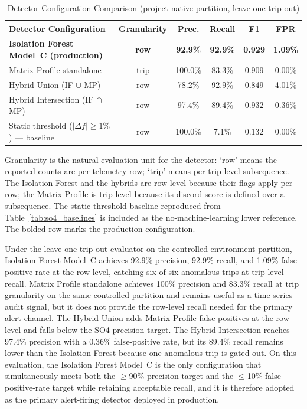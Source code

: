 \begin{table}[!htbp]
\centering
\caption{Detector Configuration Comparison (project-native partition, leave-one-trip-out)}
\label{tab:so4_config_compare}
\scriptsize
\setlength{\tabcolsep}{3pt}
\begin{tabular}{|p{}|c|c|c|c|c|}
\hline
\textbf{Detector Configuration} & \textbf{Granularity} & \textbf{Prec.} & \textbf{Recall} & \textbf{F1} & \textbf{FPR} \\
\hline
\textbf{Isolation Forest Model~C (production)} & \textbf{row} & \textbf{92.9\%} & \textbf{92.9\%} & \textbf{0.929} & \textbf{1.09\%} \\
\hline
Matrix Profile standalone & trip & 100.0\% & 83.3\% & 0.909 & 0.00\% \\
\hline
Hybrid Union (IF $\cup$ MP) & row & 78.2\% & 92.9\% & 0.849 & 4.01\% \\
\hline
Hybrid Intersection (IF $\cap$ MP) & row & 97.4\% & 89.4\% & 0.932 & 0.36\% \\
\hline
Static threshold ($|\Delta f| \geq 1\%$) --- baseline & row & 100.0\% & 7.1\% & 0.132 & 0.00\% \\
\hline
\end{tabular}
\normalsize
\end{table}

\noindent
Granularity is the natural evaluation unit for the detector: `row' means the reported counts are per telemetry row; `trip' means per trip-level subsequence. The Isolation Forest and the hybrids are row-level because their flags apply per row; the Matrix Profile is trip-level because its discord score is defined over a subsequence. The static-threshold baseline reproduced from Table~\ref{tab:so4_baselines} is included as the no-machine-learning lower reference. The bolded row marks the production configuration.

Under the leave-one-trip-out evaluator on the controlled-environment partition, Isolation Forest Model~C achieves 92.9\% precision, 92.9\% recall, and 1.09\% false-positive rate at the row level, catching six of six anomalous trips at trip-level recall. Matrix Profile standalone achieves 100\% precision and 83.3\% recall at trip granularity on the same controlled partition and remains useful as a time-series audit signal, but it does not provide the row-level recall needed for the primary alert channel. The Hybrid Union adds Matrix Profile false positives at the row level and falls below the SO4 precision target. The Hybrid Intersection reaches 97.4\% precision with a 0.36\% false-positive rate, but its 89.4\% recall remains lower than the Isolation Forest because one anomalous trip is gated out. On this evaluation, the Isolation Forest Model~C is the only configuration that simultaneously meets both the $\geq$90\% precision target and the $\leq$10\% false-positive-rate target while retaining acceptable recall, and it is therefore adopted as the primary alert-firing detector deployed in production.

